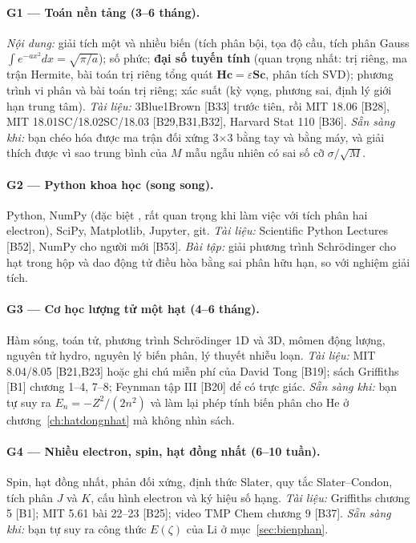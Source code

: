 \paragraph{G1 --- Toán nền tảng (3--6 tháng).}
\emph{Nội dung:} giải tích một và nhiều biến (tích phân bội, tọa độ cầu, tích phân Gauss $\int e^{-ax^2}dx=\sqrt{\pi/a}$); số phức; \textbf{đại số tuyến tính} (quan trọng nhất: trị riêng, ma trận Hermite, bài toán trị riêng tổng quát $\mathbf{Hc}=\varepsilon\mathbf{Sc}$, phân tích SVD); phương trình vi phân và bài toán trị riêng; xác suất (kỳ vọng, phương sai, định lý giới hạn trung tâm). \emph{Tài liệu:} 3Blue1Brown [B33] trước tiên, rồi MIT 18.06 [B28], MIT 18.01SC/18.02SC/18.03 [B29,B31,B32], Harvard Stat 110 [B36]. \emph{Sẵn sàng khi:} bạn chéo hóa được ma trận đối xứng 3$\times$3 bằng tay và bằng máy, và giải thích được vì sao trung bình của $M$ mẫu ngẫu nhiên có sai số cỡ $\sigma/\sqrt M$.

\paragraph{G2 --- Python khoa học (song song).}
Python, NumPy (đặc biệt , rất quan trọng khi làm việc với tích phân hai electron), SciPy, Matplotlib, Jupyter, git. \emph{Tài liệu:} Scientific Python Lectures [B52], NumPy cho người mới [B53]. \emph{Bài tập:} giải phương trình Schrödinger cho hạt trong hộp và dao động tử điều hòa bằng sai phân hữu hạn, so với nghiệm giải tích.

\paragraph{G3 --- Cơ học lượng tử một hạt (4--6 tháng).}
Hàm sóng, toán tử, phương trình Schrödinger 1D và 3D, mômen động lượng, nguyên tử hydro, nguyên lý biến phân, lý thuyết nhiễu loạn. \emph{Tài liệu:} MIT 8.04/8.05 [B21,B23] hoặc ghi chú miễn phí của David Tong [B19]; sách Griffiths [B1] chương 1--4, 7--8; Feynman tập III [B20] để có trực giác. \emph{Sẵn sàng khi:} bạn tự suy ra $E_n=-Z^2/(2n^2)$ và làm lại phép tính biến phân cho He ở chương~\ref{ch:hatdongnhat} mà không nhìn sách.

\paragraph{G4 --- Nhiều electron, spin, hạt đồng nhất (6--10 tuần).}
Spin, hạt đồng nhất, phản đối xứng, định thức Slater, quy tắc Slater--Condon, tích phân $J$ và $K$, cấu hình electron và ký hiệu số hạng. \emph{Tài liệu:} Griffiths chương 5 [B1]; MIT 5.61 bài 22--23 [B25]; video TMP Chem chương 9 [B37]. \emph{Sẵn sàng khi:} bạn tự suy ra công thức $E(\zeta)$ của Li ở mục~\ref{sec:bienphan}.

